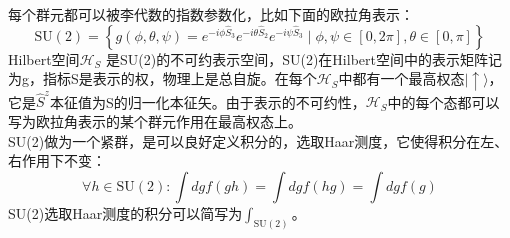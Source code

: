 \documentclass[10pt,openany]{book}
\theoremstyle{thmstyle} %
\theoremstyle{defstyle} %
\theoremstyle{prostyle} %
\begin{document}
每个群元都可以被李代数的指数参数化，比如下面的欧拉角表示：
\begin{equation*}
	\mathrm{SU}(2)=\left\{g(\phi, \theta, \psi)=e^{-i \phi \hat{S}_3} e^{-i \theta \hat{S}_2} e^{-i \psi \hat{S}_3} \mid \phi, \psi \in[0,2 \pi], \theta \in[0, \pi]\right\}
\end{equation*}
Hilbert空间$ \mathcal{H}_S $ 是SU(2)的不可约表示空间，SU(2)在Hilbert空间中的表示矩阵记为g，指标S是表示的权，物理上是总自旋。在每个$ \mathcal{H}_S $中都有一个最高权态$ |\uparrow\rangle $，它是$ \hat{S}^z $本征值为S的归一化本征矢。由于表示的不可约性，$ \mathcal{H}_S $中的每个态都可以写为欧拉角表示的某个群元作用在最高权态上。  \\

SU(2)做为一个紧群，是可以良好定义积分的，选取Haar测度，它使得积分在左、右作用下不变：
\begin{equation}
	\forall h \in \mathrm{SU}(2): \int d g f(g h)=\int d g f(h g)=\int d g f(g)
\end{equation}
SU(2)选取Haar测度的积分可以简写为$ \int_{\mathrm{SU}(2)} $。
\end{document}

